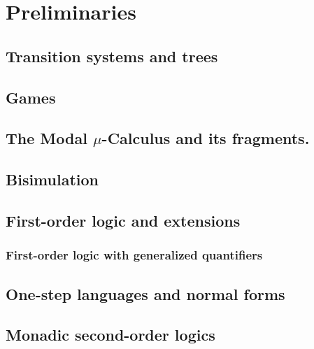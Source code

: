 \documentclass[prodmode,acmtecs]{acmsmall} %
\begin{document}
\clearpage


\section{Preliminaries}\label{sec:prel}

\subsection{Transition systems and trees} \label{ssec:prelim_trees}

\subsection{Games}



\subsection{The Modal $\mu$-Calculus and its fragments.}\label{subsec:mu}



\subsection{Bisimulation}


\subsection{First-order logic and extensions}

\subsubsection{First-order logic with generalized quantifiers}

%


\subsection{One-step languages and normal forms}



\subsection{Monadic second-order logics}\label{sec:prel-so}

\end{document}
